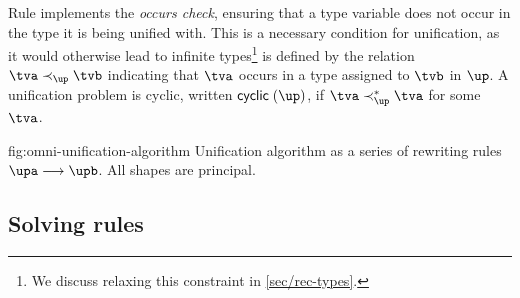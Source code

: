 \documentclass[acmsmall,screen,nonacm]{acmart}
\begin{document}
Rule  implements the \emph{occurs check}, ensuring that a type
variable does not occur in the type it is being unified with. This is a
necessary condition for unification, as it would otherwise lead to infinite
types\footnote{We discuss relaxing this constraint in \cref{sec/rec-types}.}
is defined by the relation $\tv \prec_\up \tvb$ indicating that $\tv$ occurs
in a type assigned to $\tvb$ in $\up$. A unification problem is cyclic,
written $\cyclic \up$, if $\tv \prec_\up^* \tv$ for some $\tv$.

\begin{mathparfig}[t]
  {fig:omni-unification-algorithm}
  {Unification algorithm as a series of rewriting rules
   $\upa \unif \upb$. All shapes are principal.}
   \rewrite[U-Exists]
      {(\cexists \alpha \upa) \cand \upb \\ \tv \disjoint \upb}
      {\cexists \tv {\upa \cand \upb}}

    \rewrite[U-Cycle]
      {\up \\ \cyclic \up}
      {\cfalse}

    \rewrite[U-True]
      {\up \cand \ctrue}
      {\up}

    \rewrite[U-Merge]
      {\cunif \tv \ueqa \cand \cunif \tv \ueqb}
      {\cunif \tv {\cunif \ueqa \ueqb}}

    \rewrite[U-Stutter]
      {\cunif \tv {\cunif \tv \ueq}}
      {\cunif \tv \ueq}

    \rewrite[U-Name]
      {\cunif {\pshapp \tys[\ti]} \ueq \\ \tv \disjoint \tys, \ueq }
      {\cexists \tv {\cunif \tv \ti \cand \cunif {\pshapp \tys[\tv] } \ueq}}

    \rewrite[U-Decomp]
      {\cunif {\pshapp \tvs} {\cunif {\pshapp \tvbs} \ueq}}
      {\cunif {\pshapp \tvs} \ueq \cand \cunif \tvs \tvbs}

    \rewrite[U-Clash]
      {\cunif {\pshapp \tvs} {\cunif {\pshapp[\shp]\tvbs } \ueq }\\
       \sh \neq \shp}
      {\cfalse}

    \rewrite[U-Trivial]
      {\trivial \ueq}
      {\ctrue}
\end{mathparfig}


\subsection{Solving rules}

\end{document}

